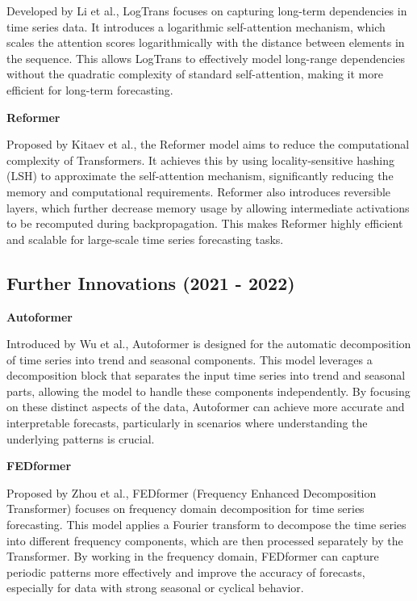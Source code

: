 \noindent Developed by Li et al.\cite{li2020enhancinglocalitybreakingmemory}, LogTrans focuses on capturing long-term dependencies in time series data. It introduces a logarithmic self-attention mechanism, which scales the attention scores logarithmically with the distance between elements in the sequence. This allows LogTrans to effectively model long-range dependencies without the quadratic complexity of standard self-attention, making it more efficient for long-term forecasting.
\vspace{10pt}


\noindent\textbf
{Reformer}
 
\noindent Proposed by Kitaev et al.\cite{kitaev2020reformerefficienttransformer}, the Reformer model aims to reduce the computational complexity of Transformers. It achieves this by using locality-sensitive hashing (LSH) to approximate the self-attention mechanism, significantly reducing the memory and computational requirements. Reformer also introduces reversible layers, which further decrease memory usage by allowing intermediate activations to be recomputed during backpropagation. This makes Reformer highly efficient and scalable for large-scale time series forecasting tasks.
\vspace{10pt}


\subsection{Further Innovations (2021 - 2022)}
\noindent\textbf
{Autoformer}
 
\noindent Introduced by Wu et al.\cite{wu2022autoformerdecompositiontransformersautocorrelation}, Autoformer is designed for the automatic decomposition of time series into trend and seasonal components. This model leverages a decomposition block that separates the input time series into trend and seasonal parts, allowing the model to handle these components independently. By focusing on these distinct aspects of the data, Autoformer can achieve more accurate and interpretable forecasts, particularly in scenarios where understanding the underlying patterns is crucial.
\vspace{10pt}


\noindent\textbf
{FEDformer}
 
\noindent Proposed by Zhou et al.\cite{zhou2022fedformerfrequencyenhanceddecomposed}, FEDformer (Frequency Enhanced Decomposition Transformer) focuses on frequency domain decomposition for time series forecasting. This model applies a Fourier transform to decompose the time series into different frequency components, which are then processed separately by the Transformer. By working in the frequency domain, FEDformer can capture periodic patterns more effectively and improve the accuracy of forecasts, especially for data with strong seasonal or cyclical behavior.
\vspace{10pt}


